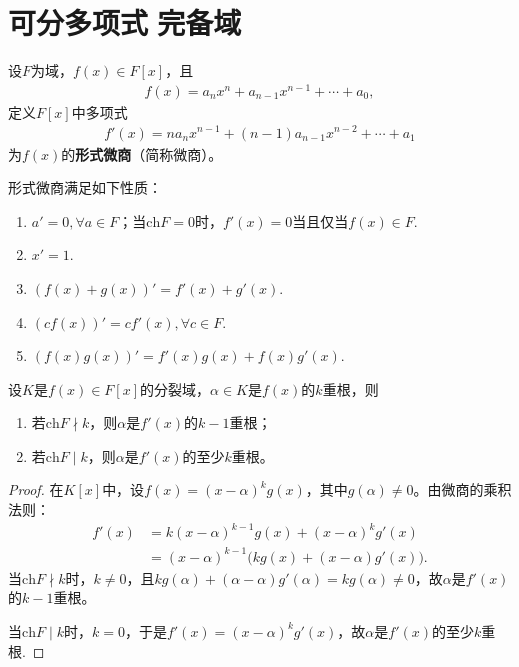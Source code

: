 \documentclass[../../main.tex]{subfiles}%
\begin{document}
\section{可分多项式$\,\,$完备域}

\begin{definition}
设$F$为域，$f(x)\in F[x]$，且
\begin{align*}
f(x)=a_nx^n+a_{n-1}x^{n-1}+\cdots+a_0,
\end{align*}
定义$F[x]$中多项式
\begin{align*}
f'(x)=na_nx^{n-1}+(n-1)a_{n-1}x^{n-2}+\cdots+a_1
\end{align*}
为$f(x)$的\textbf{形式微商}（简称微商）。
\end{definition}

\begin{remark}
形式微商满足如下性质：
\begin{enumerate}[(1)]
\item $a'=0,\forall a\in F$；当$\mathrm{ch}F=0$时，$f'(x)=0$当且仅当$f(x)\in F$.
\item $x'=1$.
\item $(f(x)+g(x))'=f'(x)+g'(x)$.
\item $(cf(x))'=cf'(x),\forall c\in F$.
\item $(f(x)g(x))'=f'(x)g(x)+f(x)g'(x)$.
\end{enumerate}
\end{remark}

\begin{theorem}
设$K$是$f(x)\in F[x]$的分裂域，$\alpha\in K$是$f(x)$的$k$重根，则
\begin{enumerate}[(1)]
\item 若$\mathrm{ch}F\nmid k$，则$\alpha$是$f'(x)$的$k-1$重根；
\item 若$\mathrm{ch}F\mid k$，则$\alpha$是$f'(x)$的至少$k$重根。
\end{enumerate}
\end{theorem}

\begin{proof}
在$K[x]$中，设$f(x)=(x-\alpha)^kg(x)$，其中$g(\alpha)\neq0$。由微商的乘积法则：
\begin{align*}
f'(x)&=k(x-\alpha)^{k-1}g(x)+(x-\alpha)^kg'(x) \\
&=(x-\alpha)^{k-1}\big(kg(x)+(x-\alpha)g'(x)\big).
\end{align*}
当$\mathrm{ch}F\nmid k$时，$k\neq0$，且$kg(\alpha)+(\alpha-\alpha)g'(\alpha)=kg(\alpha)\neq0$，故$\alpha$是$f'(x)$的$k-1$重根。

当$\mathrm{ch}F\mid k$时，$k=0$，于是$f'(x)=(x-\alpha)^kg'(x)$，故$\alpha$是$f'(x)$的至少$k$重根.
\end{proof}
\end{document}

